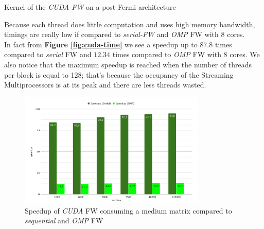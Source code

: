 \begin{algorithm}[h!]

\SetAlgoLined

\DontPrintSemicolon
 
\caption{Kernel of the \emph{CUDA-FW} on a post-Fermi architecture}\label{alg:cuda2}
\end{algorithm}

Because each thread does little computation and uses high memory bandwidth, timings are really low if compared
to \emph{serial-FW} and \emph{OMP} FW with 8 cores. \\
In fact from \textbf{Figure \ref*{fig:cuda-time}} we see a speedup up to $87.8$ times compared to \emph{serial} FW
and $12.34$ times compared to \emph{OMP} FW with 8 cores. We also notice that the maximum speedup is reached when the number of threads per block is equal to 128;
that's because the occupancy of the Streaming Multiprocessors is at its peak and there are less threads wasted.
\begin{figure}[h!]
\centering                                                                        
\includegraphics[width=3.5in]{diagrams/cuda-speedup}
\captionsetup{justification=centering}                                                                                                                                   
\caption{Speedup of \emph{CUDA} FW consuming a medium matrix compared to \emph{sequential} and \emph{OMP} FW}                                                                                                                                            
\label{fig:cuda-speedup}                                                                                                                                                           
\end{figure}

